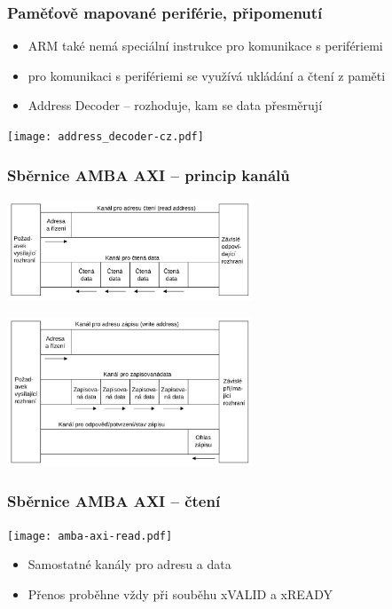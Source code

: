 \documentclass{beamer}
\begin{document}
\begin{frame}
\frametitle{Paměťově mapované periférie, připomenutí}

\begin{itemize}
\item ARM také nemá speciální instrukce pro komunikace s perifériemi
\item pro komunikaci s perifériemi se využívá ukládání a čtení z paměti
\item Address Decoder -- rozhoduje, kam se data přesměrují
\end{itemize}
\begin{center}
\texttt{[image: address\_decoder-cz.pdf]}
\end{center}
\end{frame}

\begin{frame}
\frametitle{Sběrnice AMBA AXI -- princip kanálů}

\begin{center}
\includegraphics[width=0.55\textwidth]{amba-axi-read-concept-cz}
\end{center}

\begin{center}
\includegraphics[width=0.55\textwidth]{amba-axi-write-concept-cz}
\end{center}

\end{frame}

\begin{frame}
\frametitle{Sběrnice AMBA AXI -- čtení}

\begin{center}
\texttt{[image: amba-axi-read.pdf]}
\end{center}

\begin{itemize}
\item Samostatné kanály pro adresu a data
\item Přenos proběhne vždy při souběhu xVALID a xREADY
\end{itemize}

\end{frame}
\end{document}
